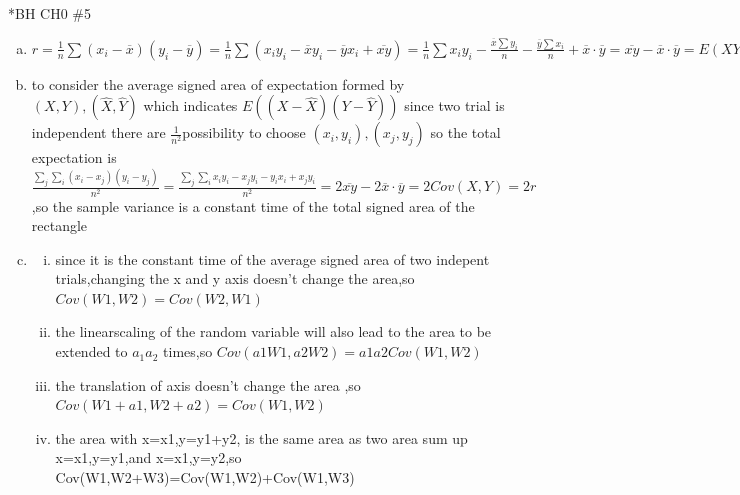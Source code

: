 \documentclass{article}
\begin{document}
\begin{homeworkProblem}*{BH CH0 \#5}
\begin{enumerate}[(a)]
	\item $r=\frac{1}{n}\sum(x_i-\overline{x})(y_i-\overline{y})=\frac{1}{n}\sum(x_iy_i-\overline{x}y_i-\overline{y}x_i+\overline{xy})=\frac{1}{n}\sum x_iy_i-\frac{\overline{x}\sum{y_i}}{n}-\frac{\overline{y}\sum{x_i}}{n}+\overline{x}\cdot\overline{y}=\overline{xy}-\overline{x}\cdot\overline{y}=E(XY)-E(X)E(Y)=COV(X,Y)$
	\item to consider the average signed area of expectation formed by $(X,Y),(\hat{X},\hat{Y})$ which indicates $E((X-\hat{X})(Y-\hat{Y}))$ since two trial is independent there are $\frac{1}{n^2}$possibility to choose $(x_i,y_i),(x_j,y_j)$ so the total expectation is $\frac{\sum_{j}\sum_{i}(x_i-x_j)(y_i-y_j)}{n^2}=\frac{\sum_{j}\sum_{i}x_iy_i-x_jy_i-y_ix_i+x_jy_i}{n^2}=2\overline{xy}-2\overline{x}\cdot\overline{y}=2Cov(X,Y)=2r$ ,so the sample variance is a constant time of the total signed area of the rectangle 
	\item \begin{enumerate}[(i)]
		\item since it is the constant time of the average signed area of two indepent trials,changing the x and y axis doesn't change the area,so $Cov(W1,W2)=Cov(W2,W1)$
	\item the linearscaling of the random variable will also lead to the area to be extended to $a_1a_2$ times,so $Cov(a1W1,a2W2)=a1a2Cov(W1,W2)$
	\item  the translation of axis doesn't change the area ,so $Cov (W 1 + a1 , W 2 + a2 ) = Cov (W 1 , W 2 ) $
	\item  the area with x=x1,y=y1+y2, is the same area as two area sum up x=x1,y=y1,and x=x1,y=y2,so Cov(W1,W2+W3)=Cov(W1,W2)+Cov(W1,W3)
	\end{enumerate}
\end{enumerate}
\end{homeworkProblem}
\end{document}
